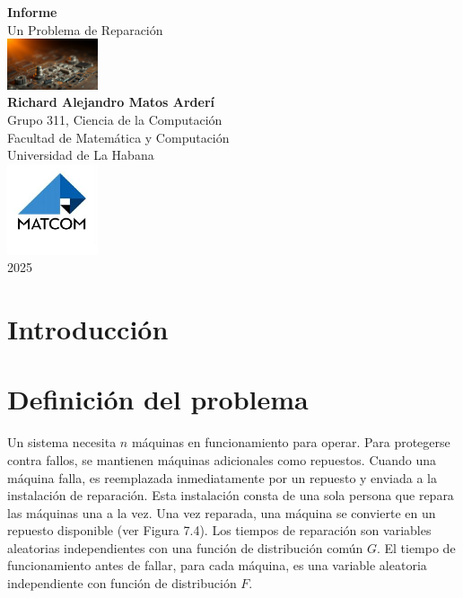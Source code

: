 \documentclass[a4paper, 12pt]{article}
\begin{document}
\graphicspath{{./}}

\begin{titlepage}
    \centering
    \vspace*{2cm}
    {\huge\bfseries Informe\\[0.4cm]}
    {\LARGE Un Problema de Reparación \\}
    \vspace*{2cm}
    \includegraphics[width=0.2\textwidth, height=0.2\textheight]{Images/Presentacion.png}\\[0.5cm]
   
    {\Large \textbf{Richard Alejandro Matos Arderí}\\[0.5cm]}
    {\Large Grupo 311, Ciencia de la Computación\\[0.5cm]}
    {\Large Facultad de Matemática y Computación\\[0.5cm]}
    {\Large Universidad de La Habana\\[0.5cm]}
    \vfill
    \includegraphics[width=0.2\textwidth, height=0.2\textheight]{Images/MATCOM.jpg}\\[0.5cm]
    {\Large 2025}
\end{titlepage}

\newpage
\tableofcontents
\newpage


\section{Introducción}

\section{Definición del problema}
Un sistema necesita $ n $ máquinas en funcionamiento para operar. Para protegerse contra fallos, se mantienen máquinas adicionales como repuestos. Cuando una máquina falla, es reemplazada inmediatamente por un repuesto y enviada a la instalación de reparación. Esta instalación consta de una sola persona que repara las máquinas una a la vez. Una vez reparada, una máquina se convierte en un repuesto disponible (ver Figura 7.4). Los tiempos de reparación son variables aleatorias independientes con una función de distribución común $ G $. El tiempo de funcionamiento antes de fallar, para cada máquina, es una variable aleatoria independiente con función de distribución $ F $.
\end{document}
